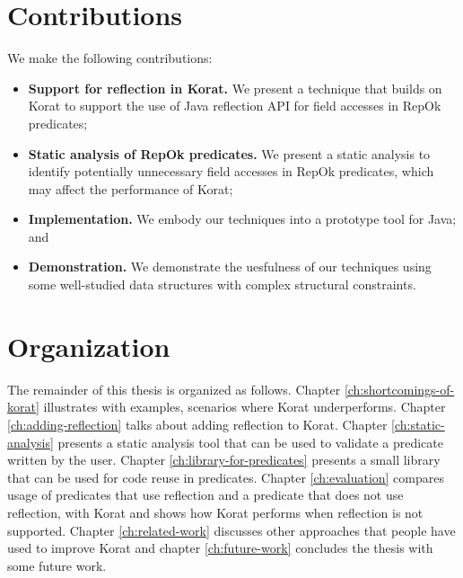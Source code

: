 \section{Contributions}
\label{sec:contributions}
\noindent We make the following contributions:

\begin{itemize}
\item {\bf Support for reflection in Korat.}  We present a technique
  that builds on Korat to support the use of Java reflection API for
  field accesses in RepOk predicates;
\item {\bf Static analysis of RepOk predicates.} We present a static
  analysis to identify potentially unnecessary field accesses in RepOk
  predicates, which may affect the performance of Korat;
\item {\bf Implementation.} We embody our techniques into a prototype
  tool for Java; and
\item {\bf Demonstration.} We demonstrate the uesfulness of our
  techniques using some well-studied data structures with complex
  structural constraints.
\end{itemize}

\section{Organization}
\label{sec:organization-of-thesis}
The remainder of this thesis is organized as follows. Chapter \ref{ch:shortcomings-of-korat} illustrates with examples, scenarios where Korat underperforms. Chapter \ref{ch:adding-reflection} talks about adding reflection to Korat. Chapter \ref{ch:static-analysis} presents a static analysis tool that can be used to validate a predicate written by the user. Chapter \ref{ch:library-for-predicates} presents a small library that can be used for code reuse in predicates. Chapter \ref{ch:evaluation} compares usage of predicates that use reflection and a predicate that does not use reflection, with Korat and shows how Korat performs when reflection is not supported. Chapter \ref{ch:related-work} discusses other approaches that people have used to improve Korat and chapter \ref{ch:future-work} concludes the thesis with some future work.
